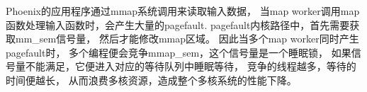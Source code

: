 Phoenix的应用程序通过mmap系统调用来读取输入数据，
当map worker调用map函数处理输入函数时，会产生大量的pagefault.
pagefault内核路径中，首先需要获取mm\_sem信号量，
然后才能修改mmap区域。
因此当多个map worker同时产生pagefault时，
多个编程便会竞争mmap\_sem，这个信号量是一个睡眠锁，
如果信号量不能满足，它便进入对应的等待队列中睡眠等待，
竞争的线程越多，等待的时间便越长，
从而浪费多核资源，造成整个多核系统的性能下降。


%
%

